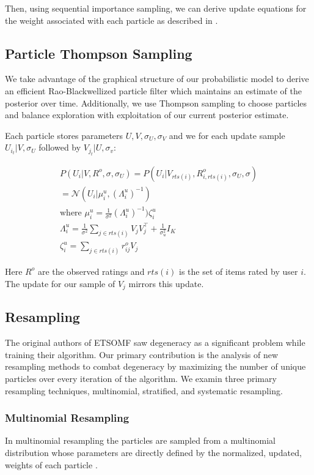 \documentclass{article}
\begin{document}
Then, using sequential importance sampling, we can derive update equations for the weight associated with each particle as described in \cite{arulampalam2002tutorial}.

\subsection{Particle Thompson Sampling}
We take advantage of the graphical structure of our probabilistic model to derive an efficient Rao-Blackwellized particle filter which maintains an estimate of the posterior over time. Additionally, we use Thompson sampling to choose particles and balance exploration with exploitation of our current posterior estimate.

Each particle stores parameters $U, V, \sigma_U, \sigma_V$ and we for each update sample $U_{i_t}|V, \sigma_U$
followed by $V_{j_t}|U, \sigma_v$:

\begin{gather*}
P(U_i | V, R^o, \sigma, \sigma_U) = P(U_i | V_{rts(i)}, R^o_{i, rts(i)}, \sigma_U, \sigma) \\
= \mathcal{N}(U_i | \mu^u_i, (\Lambda_i^u)^{-1}) \\
\text{where } \mu_i^u = \frac{1}{\sigma^2}(\Lambda_i^u)^{-1})\zeta_i^u \\
\Lambda_i^u = \frac{1}{\sigma^2} \sum_{j \in rts(i)} V_j V_j^{\top} + \frac{1}{\sigma_u^2}I_K \\
\zeta_i^u = \sum_{j \in rts(i)} r_{ij}^o V_j
\end{gather*}

Here $R^o$ are the observed ratings and $rts(i)$ is the set of items rated by user $i$. The update for our sample of $V_j$ mirrors this update.

\subsection{Resampling}
The original authors of ETSOMF saw degeneracy as a significant problem while training their algorithm. Our primary contribution is the analysis of new resampling methods to combat degeneracy by maximizing the number of unique particles over every iteration of the algorithm. We examin three primary resampling techniques, multinomial, stratified, and systematic resampling.

\subsubsection{Multinomial Resampling}
In multinomial resampling the particles are sampled from a multinomial distribution whose parameters are directly defined by the normalized, updated, weights of each particle \cite{douc2005comparison}.
\end{document}
